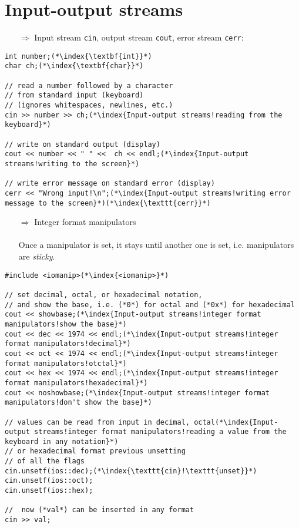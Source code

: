 \documentclass[10pt]{article}
\begin{document}
\section{Input-output streams}
\small
\begin{enumerate}
\item[$\Rightarrow$] Input stream \texttt{cin}, output stream \texttt{cout}, error stream \texttt{cerr}:
\end{enumerate}
\begin{lstlisting}
int number;(*\index{\textbf{int}}*)
char ch;(*\index{\textbf{char}}*)

// read a number followed by a character
// from standard input (keyboard)
// (ignores whitespaces, newlines, etc.)
cin >> number >> ch;(*\index{Input-output streams!reading from the keyboard}*)

// write on standard output (display)
cout << number << " " <<  ch << endl;(*\index{Input-output streams!writing to the screen}*)

// write error message on standard error (display)
cerr << "Wrong input!\n";(*\index{Input-output streams!writing error message to the screen}*)(*\index{\texttt{cerr}}*)
\end{lstlisting}
\begin{enumerate}
\item[$\Rightarrow$] Integer format manipulators\\ \\ Once a  manipulator is set, it stays until another one is set, i.e. manipulators are \emph{sticky}.
\end{enumerate}
\begin{lstlisting}
#include <iomanip>(*\index{<iomanip>}*)

// set decimal, octal, or hexadecimal notation,
// and show the base, i.e. (*0*) for octal and (*0x*) for hexadecimal
cout << showbase;(*\index{Input-output streams!integer format manipulators!show the base}*)
cout << dec << 1974 << endl;(*\index{Input-output streams!integer format manipulators!decimal}*)
cout << oct << 1974 << endl;(*\index{Input-output streams!integer format manipulators!otctal}*)
cout << hex << 1974 << endl;(*\index{Input-output streams!integer format manipulators!hexadecimal}*)
cout << noshowbase;(*\index{Input-output streams!integer format manipulators!don't show the base}*)

// values can be read from input in decimal, octal(*\index{Input-output streams!integer format manipulators!reading a value from the keyboard in any notation}*)
// or hexadecimal format previous unsetting
// of all the flags
cin.unsetf(ios::dec);(*\index{\texttt{cin}!\texttt{unset}}*)
cin.unsetf(ios::oct);
cin.unsetf(ios::hex);

//  now (*val*) can be inserted in any format
cin >> val;
\end{lstlisting}
\end{document}

